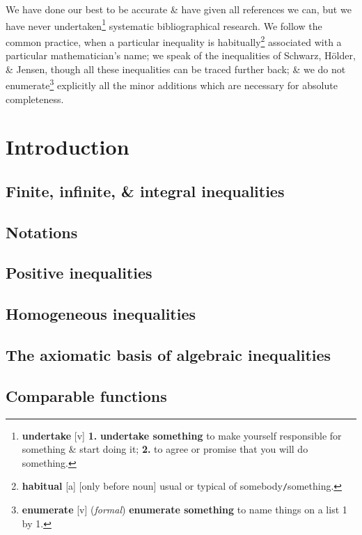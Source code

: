 \documentclass[oneside]{book}
\numberwithin{equation}{section}
\begin{document}
We have done our best to be accurate \& have given all references we can, but we have never undertaken\footnote{\textbf{undertake} [v] \textbf{1.} \textbf{undertake something} to make yourself responsible for something \& start doing it; \textbf{2.} to agree or promise that you will do something.} systematic bibliographical research. We follow the common practice, when a particular inequality is habitually\footnote{\textbf{habitual} [a] [only before noun] usual or typical of somebody\texttt{/}something.} associated with a particular mathematician's name; we speak of the inequalities of Schwarz, H\"older, \& Jensen, though all these inequalities can be traced further back; \& we do not enumerate\footnote{\textbf{enumerate} [v] (\textit{formal}) \textbf{enumerate something} to name things on a list 1 by 1.} explicitly all the minor additions which are necessary for absolute completeness.


\section{Introduction}

\subsection{Finite, infinite, \& integral inequalities}

\subsection{Notations}

\subsection{Positive inequalities}

\subsection{Homogeneous inequalities}

\subsection{The axiomatic basis of algebraic inequalities}

\subsection{Comparable functions}
\end{document}
